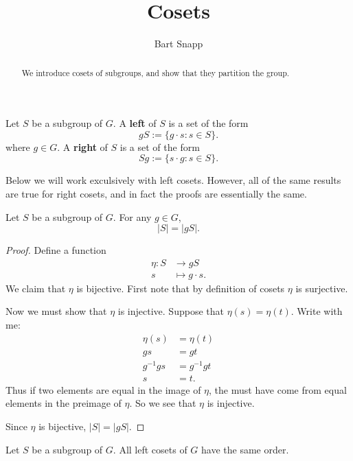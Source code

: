 \documentclass{ximera}
\author{Bart Snapp}
\title{Cosets}
\begin{document}
\begin{abstract}
We introduce cosets of subgroups, and show that they partition the
group.
\end{abstract}
\maketitle


\begin{definition}
  Let $S$ be a subgroup of $G$. A \textbf{left } of $S$ is a set of
  the form
  \[
  gS := \{g\cdot s : s\in S\}.
  \]
  where $g\in G$. A \textbf{right } of $S$ is a set of the form
  \[
  Sg := \{s\cdot g : s\in S\}.
  \]
\end{definition}

\begin{remark}
  Below we will work exculsively with left cosets. However, all of the
  same results are true for right cosets, and in fact the proofs are
  essentially the same.
\end{remark}



\begin{lemma}\label{P:CSG}
  Let $S$ be a subgroup of $G$. For any $g\in G$,
  \[
  |S| = |gS|.
  \]
  \begin{proof}
    Define a function
    \begin{align*}
      \eta: S &\to g S\\
      s &\mapsto g\cdot s.
    \end{align*}
    We claim that $\eta$ is bijective. First note that by definition
    of cosets $\eta$ is surjective.

    Now we must show that $\eta$ is injective. Suppose that $\eta(s) =
    \eta(t)$. Write with me:
    \begin{align*}
      \eta(s) &= \eta(t) \\
      gs &= gt\\
      g^{-1} g s &= g^{-1} g t\\
      s &= t.
    \end{align*}
    Thus if two elements are equal in the image of $\eta$, the must
    have come from equal elements in the preimage of $\eta$. So we see
    that $\eta$ is injective.

    Since $\eta$ is bijective, $|S|= |gS|$.
  \end{proof}
\end{lemma}

\begin{corollary}
  Let $S$ be a subgroup of $G$. All left cosets of $G$ have the same
  order.
\end{corollary}
\end{document}
